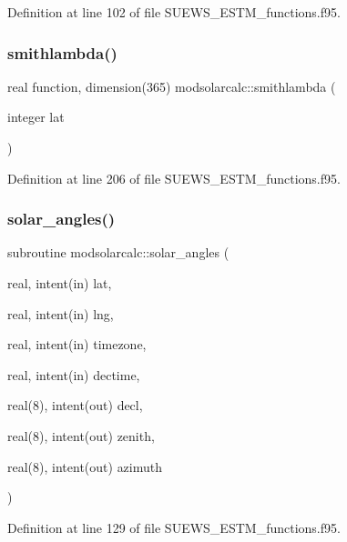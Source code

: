 Definition at line 102 of file S\+U\+E\+W\+S\+\_\+\+E\+S\+T\+M\+\_\+functions.\+f95.

\mbox{\label{namespacemodsolarcalc_abf0aac3f480ad1b6dbfdac598c453fa5}} 
\subsubsection{\texorpdfstring{smithlambda()}{smithlambda()}}
{\footnotesize\ttfamily real function, dimension(365) modsolarcalc\+::smithlambda (\begin{DoxyParamCaption}\item[{integer}]{lat }\end{DoxyParamCaption})}



Definition at line 206 of file S\+U\+E\+W\+S\+\_\+\+E\+S\+T\+M\+\_\+functions.\+f95.

\mbox{\label{namespacemodsolarcalc_a6f49f02608586154b6a3b3cddcd6aa5e}} 
\subsubsection{\texorpdfstring{solar\+\_\+angles()}{solar\_angles()}}
{\footnotesize\ttfamily subroutine modsolarcalc\+::solar\+\_\+angles (\begin{DoxyParamCaption}\item[{real, intent(in)}]{lat,  }\item[{real, intent(in)}]{lng,  }\item[{real, intent(in)}]{timezone,  }\item[{real, intent(in)}]{dectime,  }\item[{real(8), intent(out)}]{decl,  }\item[{real(8), intent(out)}]{zenith,  }\item[{real(8), intent(out)}]{azimuth }\end{DoxyParamCaption})}



Definition at line 129 of file S\+U\+E\+W\+S\+\_\+\+E\+S\+T\+M\+\_\+functions.\+f95.

\mbox{\label{namespacemodsolarcalc_a17e233516e1b3514fd9d46a9ebe44e5e}} 
